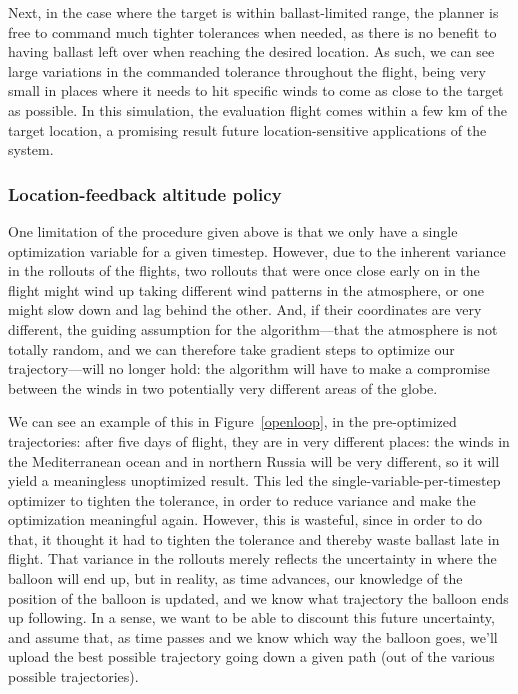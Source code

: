 \documentclass[11pt]{scrartcl} %
\begin{document}
Next, in the case where the target is within ballast-limited range, the planner is free to command much tighter tolerances when needed, as there is no benefit to having ballast left over when reaching the desired location. As such, we can see large variations in the commanded tolerance throughout the flight, being very small in places where it needs to hit specific winds to come as close to the target as possible. In this simulation, the evaluation flight comes within a few km of the target location, a promising result future location-sensitive applications of the system.


\subsubsection{Location-feedback altitude policy}
One limitation of the procedure given above is that we only have a single optimization variable for a given timestep. However, due to the inherent variance in the rollouts of the flights, two rollouts that were once close early on in the flight might wind up taking different wind patterns in the atmosphere, or one might slow down and lag behind the other. And, if their coordinates are very different, the guiding assumption for the algorithm---that the atmosphere is not totally random, and we can therefore take gradient steps to optimize our trajectory---will no longer hold: the algorithm will have to make a compromise between the winds in two potentially very different areas of the globe.

We can see an example of this in Figure~\ref{openloop}, in the pre-optimized trajectories: after five days of flight, they are in very different places: the winds in the Mediterranean ocean and in northern Russia will be very different, so it will yield a meaningless unoptimized result. This led the single-variable-per-timestep optimizer to tighten the tolerance, in order to reduce variance and make the optimization meaningful again. However, this is wasteful, since in order to do that, it thought it had to tighten the tolerance and thereby waste ballast late in flight. That variance in the rollouts merely reflects the uncertainty in where the balloon will end up, but in reality, as time advances, our knowledge of the position of the balloon is updated, and we know what trajectory the balloon ends up following. In a sense, we want to be able to discount this future uncertainty, and assume that, as time passes and we know which way the balloon goes, we'll upload the best possible trajectory going down a given path (out of the various possible trajectories).
\end{document}
